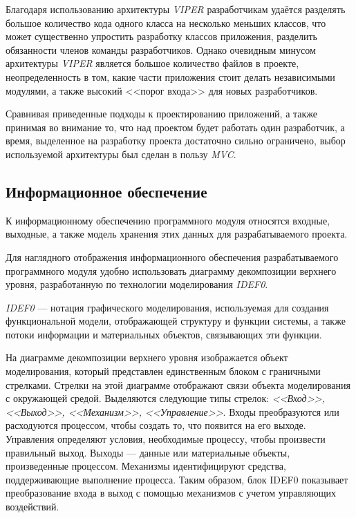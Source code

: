 Благодаря использованию архитектуры \textit{VIPER} разработчикам удаётся
разделять большое количество кода одного класса на несколько меньших классов,
что может существенно упростить разработку классов приложения,
разделить обязанности членов команды разработчиков.
Однако очевидным минусом архитектуры \textit{VIPER} является большое количество
файлов в проекте, неопределенность в том, какие части приложения стоит делать
независимыми модулями, а также высокий <<порог входа>> для новых разработчиков.

Сравнивая приведенные подходы к проектированию приложений, а также принимая
во внимание то, что над проектом будет работать один разработчик, а время,
выделенное на разработку проекта достаточно сильно ограничено, выбор
используемой архитектуры был сделан в пользу \textit{MVC}.



\subsection{Информационное обеспечение}
\label{subs:dataware}

К информационному обеспечению программного модуля относятся входные, выходные,
а также модель хранения этих данных для разрабатываемого проекта.

Для наглядного отображения информационного обеспечения разрабатываемого
программного модуля удобно использовать диаграмму декомпозиции верхнего уровня,
разработанную по технологии моделирования \textit{IDEF0}.

\textit{IDEF0} --- нотация графического моделирования, используемая для создания
функциональной модели, отображающей структуру и функции системы,
а также потоки информации и материальных объектов, связывающих эти функции.

На диаграмме декомпозиции верхнего уровня изображается объект моделирования, который
представлен единственным блоком с граничными стрелками. Стрелки на этой
диаграмме отображают связи объекта моделирования с окружающей средой.
Выделяются следующие типы стрелок: \textit{<<Вход>>, <<Выход>>, <<Механизм>>, <<Управление>>}.
Входы преобразуются или расходуются процессом, чтобы создать то,
что появится на его выходе. Управления определяют условия, необходимые процессу,
чтобы произвести правильный выход. Выходы --- данные или материальные объекты,
произведенные процессом. Механизмы идентифицируют средства,
поддерживающие выполнение процесса.
Таким образом, блок IDEF0 показывает преобразование входа в выход с помощью
механизмов с учетом управляющих воздействий.

